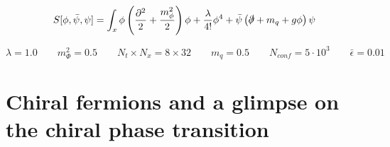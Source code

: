 \newpage

\begin{equation*}
    S[\phi, \bar\psi, \psi] = \int_x \phi \left(\frac{\partial^2}{2} + \frac{m_\phi^2}{2}\right) \phi + \frac{\lambda}{4!} \phi^4 + \bar \psi \left(\slashed{\partial} + m_q + g\phi\right) \psi
\end{equation*}

\begin{equation*} 
    \lambda = 1.0 \qquad m_\Phi^2 = 0.5 \qquad N_t \times N_x = 8 \times 32 \qquad m_q = 0.5 \qquad N_{conf} = 5 \cdot 10^3 \qquad \bar\epsilon = 0.01
\end{equation*}



\newpage
\section{Chiral fermions and a glimpse on the chiral phase transition}
\label{sec:chiral_PT}

